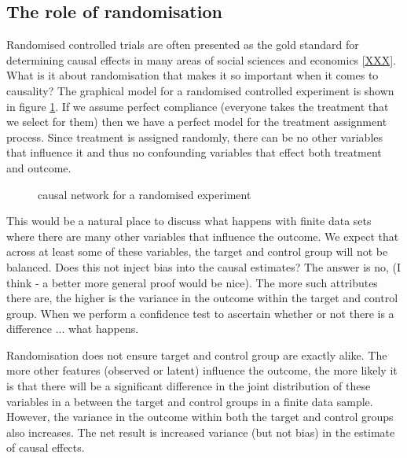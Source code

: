 \documentclass[11pt,a4paper,oneside]{book}
\theoremstyle{plain}
\theoremstyle{definition}
\begin{document}
\subsection{The role of randomisation}
Randomised controlled trials are often presented as the gold standard for determining causal effects in many areas of social sciences and economics \ref{XXX}. What is it about randomisation that makes it so important when it comes to causality? The graphical model for a randomised controlled experiment is shown in figure \ref{fig:random_experiment_network}. If we assume perfect compliance (everyone takes the treatment that we select for them) then we have a perfect model for the treatment assignment process. Since treatment is assigned randomly, there can be no other variables that influence it and thus no confounding variables that effect both treatment and outcome. 

\begin{figure}[h]
\caption{causal network for a randomised experiment}
\label{fig:random_experiment_network}
\centering
{}
\end{figure} 

This would be a natural place to discuss what happens with finite data sets where there are many other variables that influence the outcome. We expect that across at least some of these variables, the target and control group will not be balanced. Does this not inject bias into the causal estimates? The answer is no, (I think - a better more general proof would be nice). The more such attributes there are, the higher is the variance in the outcome within the target and control group. When we perform a confidence test to ascertain whether or not there is a difference ... what happens.

Randomisation does not ensure target and control group are exactly alike. The more other features (observed or latent) influence the outcome, the more likely it is that there will be a significant difference in the joint distribution of these variables in a between the target and control groups in a finite data sample. However, the variance in the outcome within both the target and control groups also increases. The net result is increased variance (but not bias) in  the estimate of causal effects. 
\end{document}
